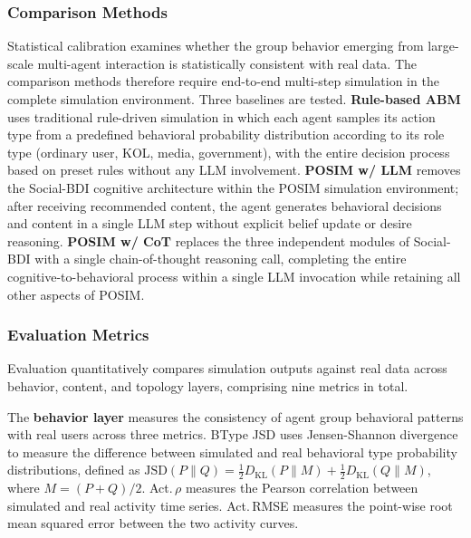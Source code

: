 \documentclass[a4paper,fleqn]{cas-dc}
\begin{document}
\subsubsection{Comparison Methods}

Statistical calibration examines whether the group behavior emerging from large-scale multi-agent interaction is statistically consistent with real data. The comparison methods therefore require end-to-end multi-step simulation in the complete simulation environment. Three baselines are tested. \textbf{Rule-based ABM} uses traditional rule-driven simulation in which each agent samples its action type from a predefined behavioral probability distribution according to its role type (ordinary user, KOL, media, government), with the entire decision process based on preset rules without any LLM involvement. \textbf{POSIM w/ LLM} removes the Social-BDI cognitive architecture within the POSIM simulation environment; after receiving recommended content, the agent generates behavioral decisions and content in a single LLM step without explicit belief update or desire reasoning. \textbf{POSIM w/ CoT} replaces the three independent modules of Social-BDI with a single chain-of-thought reasoning call, completing the entire cognitive-to-behavioral process within a single LLM invocation while retaining all other aspects of POSIM.

\subsubsection{Evaluation Metrics}

Evaluation quantitatively compares simulation outputs against real data across behavior, content, and topology layers, comprising nine metrics in total.

The \textbf{behavior layer} measures the consistency of agent group behavioral patterns with real users across three metrics. BType JSD uses Jensen-Shannon divergence to measure the difference between simulated and real behavioral type probability distributions, defined as $\text{JSD}(P \| Q) = \tfrac{1}{2} D_{\text{KL}}(P \| M) + \tfrac{1}{2} D_{\text{KL}}(Q \| M)$, where $M = (P + Q)/2$. Act.\,$\rho$ measures the Pearson correlation between simulated and real activity time series. Act.\,RMSE measures the point-wise root mean squared error between the two activity curves.
\end{document}
